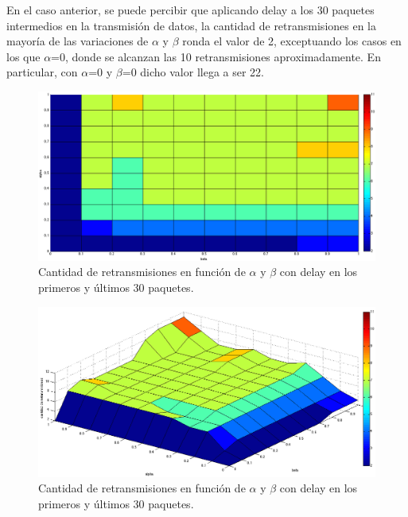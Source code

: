 \documentclass[10pt, a4paper]{article}
\begin{document}
En el caso anterior, se puede percibir que aplicando delay a los 30 paquetes intermedios en la transmisión de datos, la cantidad de retransmisiones en la mayoría de las variaciones de $\alpha$ y $\beta$ ronda el valor de 2, exceptuando los casos en los que $\alpha$=0, donde se alcanzan las 10 retransmisiones aproximadamente. En particular, con $\alpha$=0 y $\beta$=0 dicho valor llega a ser 22.\\

\begin{figure}[H]
\begin{center}
\includegraphics[width=17cm]{delay-30I-ret-costado.png}
\caption{Cantidad de retransmisiones en función de $\alpha$ y $\beta$ con delay en los primeros y últimos 30 paquetes.}
\end{center}
\end{figure}

\begin{figure}[H]
\begin{center}
\includegraphics[width=17cm]{delay-30I-ret.png}
\caption{Cantidad de retransmisiones en función de $\alpha$ y $\beta$ con delay en los primeros y últimos 30 paquetes.}
\end{center}
\end{figure}
\end{document}
